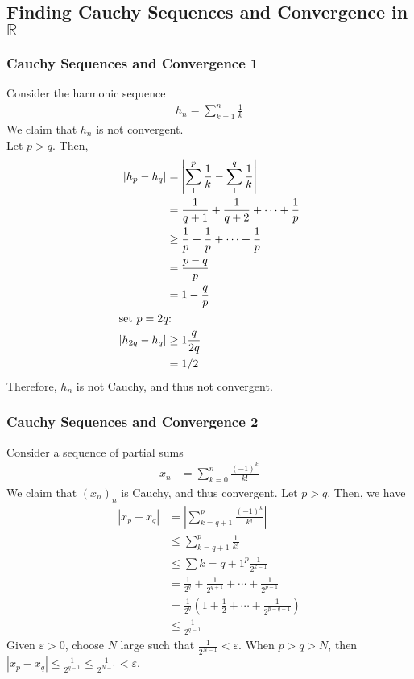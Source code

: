 \documentclass[10pt]{extarticle}
\newcommand{\R}{\mathbb{R}}
\begin{document}
  \subsection{Finding Cauchy Sequences and Convergence in $\R$}%
  \subsubsection{Cauchy Sequences and Convergence 1}%
   Consider the harmonic sequence
    \begin{align*}
      h_n = \sum_{k=1}^{n}\frac{1}{k}
    \end{align*}
    We claim that $h_n$ is not convergent.\\

    Let $p > q$. Then,
    \begin{align*}
      \left|h_p-h_q\right| &= \left|\sum_{1}^{p}\frac{1}{k} - \sum_{1}^{q}\frac{1}{k}\right|\\
                           &= \frac{1}{q+1} + \frac{1}{q+2} + \cdots + \frac{1}{p}\\
                           &\geq \frac{1}{p} + \frac{1}{p} + \cdots + \frac{1}{p}\\
                           &= \frac{p-q}{p} \\
                           &= 1-\frac{q}{p}\\
                           \shortintertext{set $p = 2q$:}
      \left|h_{2q}-h_q\right| &\geq 1\frac{q}{2q}\\
                              &= 1/2
    \end{align*}
    Therefore, $h_n$ is not Cauchy, and thus not convergent.\\
  \subsubsection{Cauchy Sequences and Convergence 2}%
    Consider a sequence of partial sums
    \begin{align*}
      x_n &= \sum_{k=0}^{n} \frac{(-1)^k}{k!}
    \end{align*}
    We claim that $(x_n)_n$ is Cauchy, and thus convergent. Let $p > q$. Then, we have
    \begin{align*}
      \left|x_p-x_q\right| &= \left|\sum_{k=q+1}^{p}\frac{(-1)^k}{k!}\right|\\
                           &\leq \sum_{k=q+1}^{p}\frac{1}{k!}\\
                           &\leq \sum{k=q+1}^{p}\frac{1}{2^{k-1}}\\
                           &= \frac{1}{2^q} + \frac{1}{2^{q+1}} + \cdots + \frac{1}{2^{p-1}}\\
                           &= \frac{1}{2^q}\left(1 + \frac{1}{2} + \cdots + \frac{1}{2^{p-q-1}}\right)\\
                           &\leq \frac{1}{2^{q-1}}
    \end{align*}
    Given $\varepsilon > 0$, choose $N$ large such that $\displaystyle \frac{1}{2^{N-1}} < \varepsilon$. When $p > q > N$, then $\displaystyle|x_p-x_q| \leq \frac{1}{2^{q-1}} \leq \frac{1}{2^{N-1}} < \varepsilon$.\\
\end{document}
